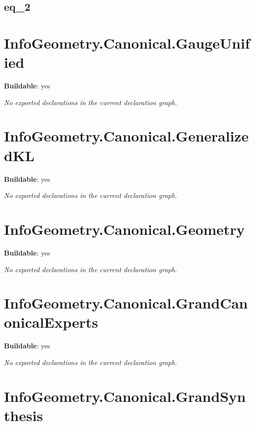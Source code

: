 \begin{theorem}[blueprint="infogeometry:canonical:gauge:quad:eq_1"]
\end{theorem}

\subsection*{eq_2}

\begin{theorem}[blueprint="infogeometry:canonical:gauge:quad:eq_2"]
\end{theorem}

\section{InfoGeometry.Canonical.GaugeUnified}

\noindent\textbf{Buildable}: yes

\noindent\emph{No exported declarations in the current declaration graph.}

\section{InfoGeometry.Canonical.GeneralizedKL}

\noindent\textbf{Buildable}: yes

\noindent\emph{No exported declarations in the current declaration graph.}

\section{InfoGeometry.Canonical.Geometry}

\noindent\textbf{Buildable}: yes

\noindent\emph{No exported declarations in the current declaration graph.}

\section{InfoGeometry.Canonical.GrandCanonicalExperts}

\noindent\textbf{Buildable}: yes

\noindent\emph{No exported declarations in the current declaration graph.}

\section{InfoGeometry.Canonical.GrandSynthesis}

